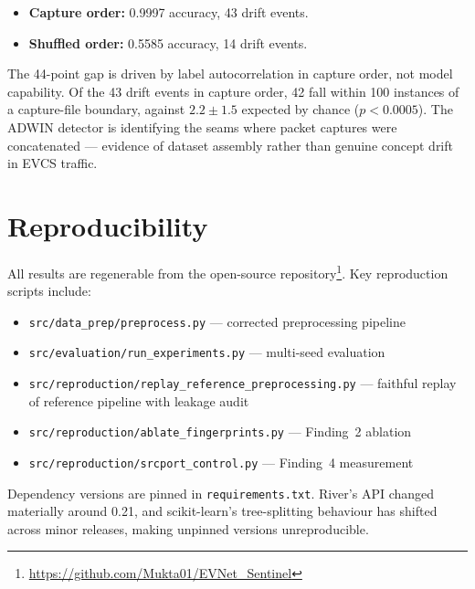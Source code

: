 \documentclass[conference]{IEEEtran}
\newcommand{\col}[1]{\texttt{\small #1}}
\begin{document}
\begin{itemize}
    \item \textbf{Capture order:} 0.9997 accuracy, 43 drift events.
    \item \textbf{Shuffled order:} 0.5585 accuracy, 14 drift events.
\end{itemize}

The 44-point gap is driven by label autocorrelation in capture order, not model capability. Of the 43 drift events in capture order, 42 fall within 100 instances of a capture-file boundary, against $2.2 \pm 1.5$ expected by chance ($p < 0.0005$). The ADWIN detector is identifying the seams where packet captures were concatenated --- evidence of dataset assembly rather than genuine concept drift in EVCS traffic.

\section{Reproducibility}

All results are regenerable from the open-source repository\footnote{\url{https://github.com/Mukta01/EVNet\_Sentinel}}. Key reproduction scripts include:

\begin{itemize}
    \item \col{src/data\_prep/preprocess.py} --- corrected preprocessing pipeline
    \item \col{src/evaluation/run\_experiments.py} --- multi-seed evaluation
    \item \col{src/reproduction/replay\_reference\_preprocessing.py} --- faithful replay of reference pipeline with leakage audit
    \item \col{src/reproduction/ablate\_fingerprints.py} --- Finding~2 ablation
    \item \col{src/reproduction/srcport\_control.py} --- Finding~4 measurement
\end{itemize}

Dependency versions are pinned in \col{requirements.txt}. River's API changed materially around 0.21, and scikit-learn's tree-splitting behaviour has shifted across minor releases, making unpinned versions unreproducible.

\end{document}
